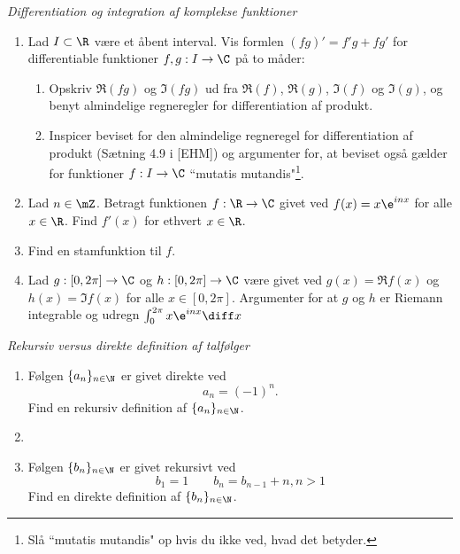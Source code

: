 \begin{opg} \emph{Differentiation og integration af komplekse funktioner}
	\begin{enumerate}
		\item Lad $ I\subset \R $ være et åbent interval. Vis formlen $ (fg)'=f'g+fg' $ for differentiable funktioner $ f,g:I\to \C $ på to måder:
		\begin{enumerate}[label=\roman*]
			\item Opskriv $ \Re(fg) $ og $ \Im(fg) $ ud fra $ \Re(f) $, $ \Re(g) $, $ \Im(f) $ og $ \Im(g) $, og benyt almindelige regneregler for differentiation af produkt.
			\item Inspicer beviset for den almindelige regneregel for differentiation af produkt (Sætning 4.9 i [EHM]) og argumenter for, at beviset også gælder for funktioner $ f: I\to\C $ ``mutatis mutandis"\footnote{Slå ``mutatis mutandis" op hvis du ikke ved, hvad det betyder.}.
		\end{enumerate}
		\item Lad $ n\in \mZ $. Betragt funktionen $ f:\R \to \C $ givet ved $ f(x)=x\e^{inx} $ for alle $ x\in \R $. Find $ f'(x) $ for ethvert $ x\in \R $.
		\item Find en stamfunktion til $ f $.
		\item Lad $ g:[0,2\pi]\to\C $ og $ h:[0,2\pi]\to\C $ være givet ved $ g(x)=\Re f(x) $ og $ h(x)=\Im f(x) $ for alle $ x\in[0,2\pi] $. Argumenter for at $ g $ og $ h $ er Riemann integrable og udregn $ \int_{0}^{2\pi}x\e^{inx} \diff x $
	\end{enumerate}
\end{opg}

\begin{opg} \emph{Rekursiv versus direkte definition af talf\o{}lger}
\begin{enumerate}
\item F\o{}lgen $\{a_n\}_{n\in\N}$ er givet direkte ved
\[
a_n=(-1)^n.
\]
 Find en rekursiv definition af  $\{a_n\}_{n\in\N}$.
\item \item F\o{}lgen $\{b_n\}_{n\in\N}$ er givet rekursivt ved
\[
b_1=1\qquad b_n=b_{n-1}+n, n>1
\]
 Find en direkte definition af  $\{b_n\}_{n\in\N}$.
\end{enumerate}

\end{opg}


